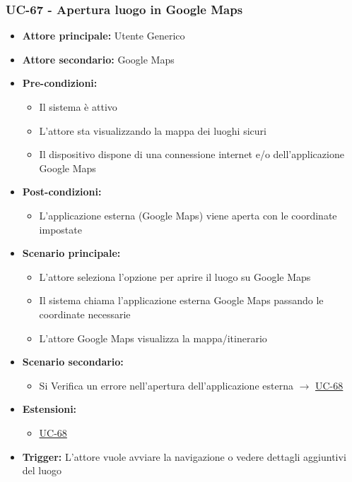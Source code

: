 \documentclass[a4paper,12pt]{article}
\newcommand{\ignoreglossary}{}
\begin{document}
\subsubsection{UC-67 - Apertura luogo in Google Maps} \label{subsec:UC-67}
\begin{itemize}
    \item \textbf{Attore principale:} Utente Generico
    \item \textbf{Attore secondario:} Google Maps
    \item \textbf{Pre-condizioni:} 
    \begin{itemize}
        \item Il sistema è attivo
        \item L'attore sta visualizzando la mappa dei luoghi sicuri
        \item Il dispositivo dispone di una connessione internet e/o dell'applicazione Google Maps
    \end{itemize}
    \item \textbf{Post-condizioni:}
    \begin{itemize}
        \item L'applicazione esterna (Google Maps) viene aperta con le coordinate impostate
    \end{itemize}
    \item \textbf{Scenario principale:} 
    \begin{itemize}
        \item L'attore seleziona l'opzione per aprire il luogo su Google Maps
        \item Il sistema chiama l'applicazione esterna Google Maps passando le coordinate necessarie
        \item L'attore Google Maps visualizza la mappa/itinerario
    \end{itemize}
    \item \textbf{Scenario secondario:} 
    \begin{itemize}
         \item Si \ignoreglossary{Verifica} un errore nell'apertura dell'applicazione esterna $\rightarrow$ \hyperref[subsec:UC-68]{UC-68}
    \end{itemize}
    \item \textbf{Estensioni:}
     \begin{itemize}
         \item \hyperref[subsec:UC-68]{UC-68}
     \end{itemize}
    \item \textbf{Trigger:} L'attore vuole avviare la navigazione o vedere dettagli aggiuntivi del luogo
\end{itemize}
\end{document}
